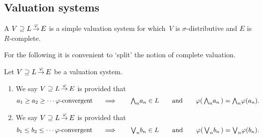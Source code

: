 \documentclass[main.tex]{subfiles}
\begin{document}
\subsection{Valuation systems}
\begin{dfn}
\label{D:system}
A  $V \supseteq L\,\smash{\stackrel{\varphi}{\rightarrow}}\,E$
is a simple valuation system
for which~$V$ is $\sigma$-distributive
and $E$ is $R$-complete.
\end{dfn}

For the following it is convenient to `split' the notion
of complete valuation.
\begin{dfn}
\label{D:system-complete2}
Let $V \supseteq L\,\smash{\stackrel{\varphi}{\rightarrow}}\,E$ be
a valuation system.
\begin{enumerate}
\item
\label{D:system-complete2-pi}
We say $V \supseteq L\,\smash{\stackrel{\varphi}{\rightarrow}}\,E$ is 
provided that
\begin{alignat*}{5}
a_1 \geq a_2 \geq \dotsb \text{$\varphi$-convergent }
  \quad &\implies \quad 
  & \textstyle{\bigwedge}_n a_n &\in L\quad 
  &&\text{and}\quad
  &\varphi(\,\textstyle{\bigwedge}_n a_n\,) &= \textstyle{\bigwedge}_n \varphi(a_n). 
\end{alignat*}
\item
We say $V \supseteq L\,\smash{\stackrel{\varphi}{\rightarrow}}\,E$ is 
provided that
\begin{alignat*}{5}
b_1 \leq b_2 \leq \dotsb \text{$\varphi$-convergent }
  \quad &\implies \quad 
  & \textstyle{\bigvee}_n b_n &\in L\quad 
  &&\text{and}\quad
  &\varphi(\,\textstyle{\bigvee}_n b_n\,) &= \textstyle{\bigvee}_n \varphi(b_n). 
\end{alignat*}

\end{enumerate}
\end{dfn}

%
%
\end{document}
